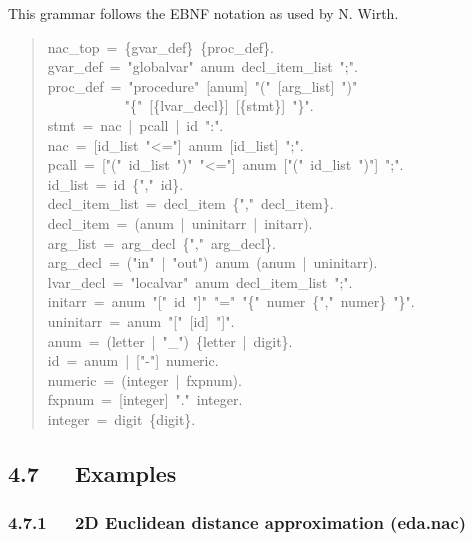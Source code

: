 \documentclass[a4paper]{article}
\begin{document}
This grammar follows the EBNF notation as used by N. Wirth.
%
\begin{quote}{\ttfamily \raggedright \noindent
nac\_top~=~\{gvar\_def\}~\{proc\_def\}.\\
gvar\_def~=~"globalvar"~anum~decl\_item\_list~";".\\
proc\_def~=~"procedure"~{[}anum{]}~"("~{[}arg\_list{]}~")"\\
~~~~~~~~~~~"\{"~{[}\{lvar\_decl\}{]}~{[}\{stmt\}{]}~"\}".\\
stmt~=~nac~|~pcall~|~id~":".\\
nac~=~{[}id\_list~"<="{]}~anum~{[}id\_list{]}~";".\\
pcall~=~{[}"("~id\_list~")"~"<="{]}~anum~{[}"("~id\_list~")"{]}~";".\\
id\_list~=~id~\{","~id\}.\\
decl\_item\_list~=~decl\_item~\{","~decl\_item\}.\\
decl\_item~=~(anum~|~uninitarr~|~initarr).\\
arg\_list~=~arg\_decl~\{","~arg\_decl\}.\\
arg\_decl~=~("in"~|~"out")~anum~(anum~|~uninitarr).\\
lvar\_decl~=~"localvar"~anum~decl\_item\_list~";".\\
initarr~=~anum~"{[}"~id~"{]}"~"="~"\{"~numer~\{","~numer\}~"\}".\\
uninitarr~=~anum~"{[}"~{[}id{]}~"{]}".\\
anum~=~(letter~|~"\_")~\{letter~|~digit\}.\\
id~=~anum~|~{[}"-"{]}~numeric.\\
numeric~=~(integer~|~fxpnum).\\
fxpnum~=~{[}integer{]}~"."~integer.\\
integer~=~digit~\{digit\}.
}
\end{quote}


\subsection{4.7~~~Examples%
  \label{examples}%
}


\subsubsection{4.7.1~~~2D Euclidean distance approximation (eda.nac)%
  \label{d-euclidean-distance-approximation-eda-nac}%
}
\end{document}
